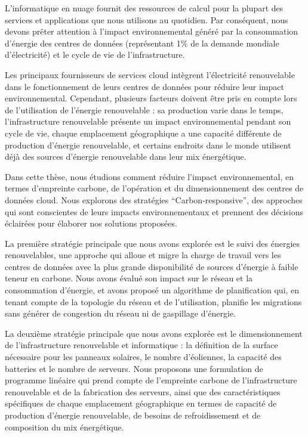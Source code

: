 L'informatique en nuage fournit des ressources de calcul pour la plupart des services et applications que nous utilisons au quotidien. Par conséquent, nous devons prêter attention à l'impact environnemental généré par la consommation d'énergie des centres de données (représentant 1\% de la demande mondiale d'électricité) et le cycle de vie de l'infrastructure.


Les principaux fournisseurs de services cloud intègrent l'électricité renouvelable dans le fonctionnement de leurs centres de données pour réduire leur impact environnemental. Cependant, plusieurs facteurs doivent être pris en compte lors de l'utilisation de l'énergie renouvelable : sa production varie dans le temps, l'infrastructure renouvelable présente un impact environnemental pendant son cycle de vie, chaque emplacement géographique a une capacité différente de production d'énergie renouvelable, et certains endroits dans le monde utilisent déjà des sources d'énergie renouvelable dans leur mix énergétique.


Dans cette thèse, nous étudions comment réduire l'impact environnemental, en termes d'empreinte carbone, de l'opération et du dimensionnement des centres de données cloud. Nous explorons des stratégies ``Carbon-responsive'', des approches qui sont conscientes de leurs impacts environnementaux et prennent des décisions éclairées pour élaborer nos solutions proposées.

La première stratégie principale que nous avons explorée est le suivi des énergies renouvelables, une approche qui alloue et migre la charge de travail vers les centres de données avec la plus grande disponibilité de sources d'énergie à faible teneur en carbone. Nous avons évalué son impact sur le réseau et la consommation d'énergie, et avons proposé un algorithme de planification qui, en tenant compte de la topologie du réseau et de l'utilisation, planifie les migrations sans générer de congestion du réseau ni de gaspillage d'énergie.

La deuxième stratégie principale que nous avons explorée est le dimensionnement de l'infrastructure renouvelable et informatique : la définition de la surface nécessaire pour les panneaux solaires, le nombre d'éoliennes, la capacité des batteries et le nombre de serveurs. Nous proposons une formulation de programme linéaire qui prend compte de l'empreinte carbone de l'infrastructure renouvelable et de la fabrication des serveurs, ainsi que des caractéristiques spécifiques de chaque emplacement géographique en termes de capacité de production d'énergie renouvelable, de besoins de refroidissement et de composition du mix énergétique.


